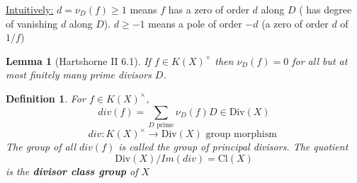 \documentclass[11pt]{article}
\newtheorem{lemma}[thm]{Lemma}
\newtheorem{dfn}[thm]{Definition}
\newcommand{\lrta}{\longrightarrow}
\begin{document}
\underline{Intuitively:}
$d=\nu_D(f)\geq 1$ means $f$ has a zero of order $d$ along $D$ ( has degree of vanishing $d$ along $D$). $d\geq -1$ means a pole of order $-d$ (a zero of order $d$ of $1/f$)



\begin{lemma}[Hartshorne II 6.1] If $f\in K(X)^\times$ then $\nu_D(f)=0$ for all but at most finitely many prime divisors $D$.
\end{lemma}
\begin{dfn}
For 
$f\in K(X)^\times$,
$$
div(f)=\sum_{D\text{ prime}} \nu_D(f) D \in \text{Div}(X)
$$
$$
div:K(X)^\times\lrta \text{Div}(X)\text{ group morphism }
$$
The group of all $div(f) $ is called the group of principal divisors. The quotient
$$
\text{Div}(X)/Im(div)=\text{Cl}(X)
$$
is the \textbf{divisor class group } of $X$
\end{dfn}
\end{document}
